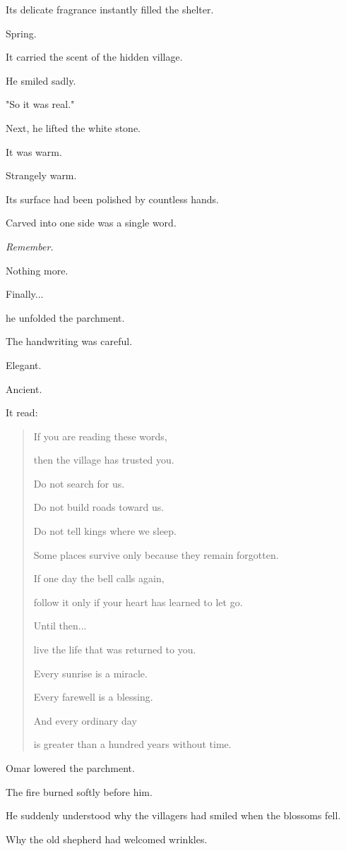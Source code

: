 \documentclass[12pt,openany]{book}
\begin{document}
Its delicate fragrance instantly filled the shelter.

Spring.

It carried the scent of the hidden village.

He smiled sadly.

"So it was real."

Next, he lifted the white stone.

It was warm.

Strangely warm.

Its surface had been polished by countless hands.

Carved into one side was a single word.

\emph{Remember.}

Nothing more.

Finally...

he unfolded the parchment.

The handwriting was careful.

Elegant.

Ancient.

It read:

\begin{quote}
If you are reading these words,

then the village has trusted you.

Do not search for us.

Do not build roads toward us.

Do not tell kings where we sleep.

Some places survive only because they remain forgotten.

If one day the bell calls again,

follow it only if your heart has learned to let go.

Until then...

live the life that was returned to you.

Every sunrise is a miracle.

Every farewell is a blessing.

And every ordinary day

is greater than a hundred years without time.
\end{quote}

Omar lowered the parchment.

The fire burned softly before him.

He suddenly understood why the villagers had smiled when the blossoms fell.

Why the old shepherd had welcomed wrinkles.
\end{document}
